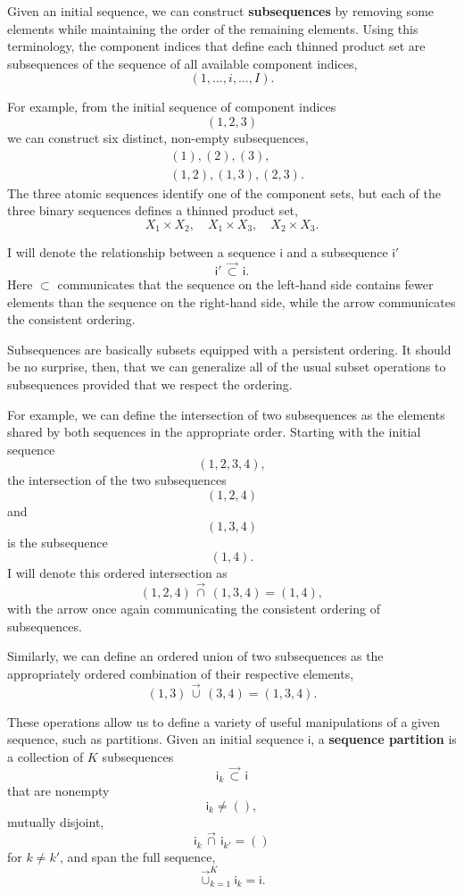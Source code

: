 \documentclass[
  letterpaper,
  DIV=11,
  numbers=noendperiod]{scrartcl}
\begin{document}
Given an initial sequence, we can construct \textbf{subsequences} by
removing some elements while maintaining the order of the remaining
elements. Using this terminology, the component indices that define each
thinned product set are subsequences of the sequence of all available
component indices, \[
(1, \ldots, i, \ldots, I).
\]

For example, from the initial sequence of component indices \[
( 1, 2, 3 )
\] we can construct six distinct, non-empty subsequences, \begin{align*}
&( 1 ), ( 2 ), ( 3 ),
\\
&( 1, 2 ), ( 1, 3 ), ( 2, 3 ).
\end{align*} The three atomic sequences identify one of the component
sets, but each of the three binary sequences defines a thinned product
set, \[
X_{1} \times X_{2}, \quad
X_{1} \times X_{3}, \quad
X_{2} \times X_{3}.
\]

I will denote the relationship between a sequence \(\mathsf{i}\) and a
subsequence \(\mathsf{i}'\) \[
\mathsf{i}' \, \vec{\subset} \, \mathsf{i}.
\] Here \(\subset\) communicates that the sequence on the left-hand side
contains fewer elements than the sequence on the right-hand side, while
the arrow communicates the consistent ordering.

Subsequences are basically subsets equipped with a persistent ordering.
It should be no surprise, then, that we can generalize all of the usual
subset operations to subsequences provided that we respect the ordering.

For example, we can define the intersection of two subsequences as the
elements shared by both sequences in the appropriate order. Starting
with the initial sequence \[
( 1, 2, 3, 4 ),
\] the intersection of the two subsequences \[
( 1, 2, 4 )
\] and \[
( 1, 3, 4 )
\] is the subsequence \[
(1, 4).
\] I will denote this ordered intersection as \[
( 1, 2, 4 ) \, \vec{\cap} \, (1, 3, 4) = (1, 4),
\] with the arrow once again communicating the consistent ordering of
subsequences.

Similarly, we can define an ordered union of two subsequences as the
appropriately ordered combination of their respective elements, \[
( 1, 3 ) \, \vec{\cup} \, ( 3, 4 )
=
( 1, 3, 4 ).
\]

These operations allow us to define a variety of useful manipulations of
a given sequence, such as partitions. Given an initial sequence
\(\mathsf{i}\), a \textbf{sequence partition} is a collection of \(K\)
subsequences \[
\mathsf{i}_{k} \, \vec{\subset} \, \mathsf{i}
\] that are nonempty \[
\mathsf{i}_{k} \ne (),
\] mutually disjoint, \[
\mathsf{i}_{k} \, \vec{\cap} \, \mathsf{i}_{k'} = ()
\] for \(k \ne k'\), and span the full sequence, \[
\vec{\cup}_{k = 1}^{K} \mathsf{i}_{k} = \mathsf{i}.
\]
\end{document}
